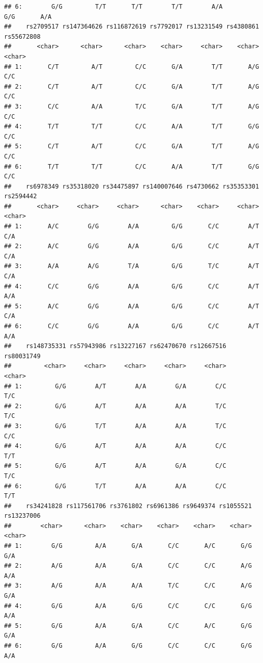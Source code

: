\documentclass[
]{article}
\begin{document}
\begin{verbatim}
## 6:        G/G         T/T       T/T        T/T        A/A         G/G       A/A
##    rs2709517 rs147364626 rs116872619 rs7792017 rs13231549 rs4380861 rs55672808
##       <char>      <char>      <char>    <char>     <char>    <char>     <char>
## 1:       C/T         A/T         C/C       G/A        T/T       A/G        C/C
## 2:       C/T         A/T         C/C       G/A        T/T       A/G        C/C
## 3:       C/C         A/A         T/C       G/A        T/T       A/G        C/C
## 4:       T/T         T/T         C/C       A/A        T/T       G/G        C/C
## 5:       C/T         A/T         C/C       G/A        T/T       A/G        C/C
## 6:       T/T         T/T         C/C       A/A        T/T       G/G        C/C
##    rs6978349 rs35318020 rs34475897 rs140007646 rs4730662 rs35353301 rs2594442
##       <char>     <char>     <char>      <char>    <char>     <char>    <char>
## 1:       A/C        G/G        A/A         G/G       C/C        A/T       C/A
## 2:       A/C        G/G        A/A         G/G       C/C        A/T       C/A
## 3:       A/A        A/G        T/A         G/G       T/C        A/T       C/A
## 4:       C/C        G/G        A/A         G/G       C/C        A/T       A/A
## 5:       A/C        G/G        A/A         G/G       C/C        A/T       C/A
## 6:       C/C        G/G        A/A         G/G       C/C        A/T       A/A
##    rs148735331 rs57943986 rs13227167 rs62470670 rs12667516 rs80031749
##         <char>     <char>     <char>     <char>     <char>     <char>
## 1:         G/G        A/T        A/A        G/A        C/C        T/C
## 2:         G/G        A/T        A/A        A/A        T/C        T/C
## 3:         G/G        T/T        A/A        A/A        T/C        C/C
## 4:         G/G        A/T        A/A        A/A        C/C        T/T
## 5:         G/G        A/T        A/A        G/A        C/C        T/C
## 6:         G/G        T/T        A/A        A/A        C/C        T/T
##    rs34241828 rs117561706 rs3761802 rs6961386 rs9649374 rs1055521 rs13237006
##        <char>      <char>    <char>    <char>    <char>    <char>     <char>
## 1:        G/G         A/A       G/A       C/C       A/C       G/G        G/A
## 2:        A/G         A/A       G/A       C/C       C/C       A/G        A/A
## 3:        A/G         A/A       A/A       T/C       C/C       A/G        G/A
## 4:        G/G         A/A       G/G       C/C       C/C       G/G        A/A
## 5:        G/G         A/A       G/A       C/C       A/C       G/G        G/A
## 6:        G/G         A/A       G/G       C/C       C/C       G/G        A/A

\end{verbatim}
\end{document}
